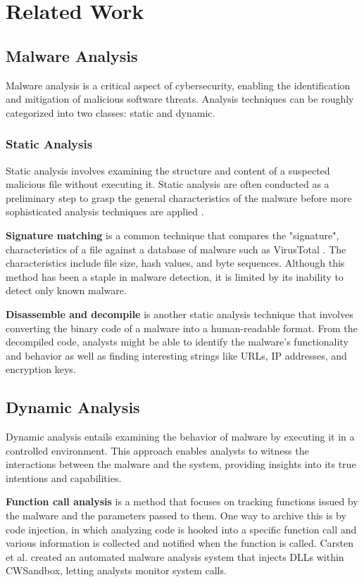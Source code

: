 \section{Related Work}
\subsection{Malware Analysis}
Malware analysis is a critical aspect of cybersecurity, enabling the identification
and mitigation of malicious software threats.
Analysis techniques can be roughly categorized into two classes: static and dynamic.

\subsubsection{Static Analysis}
Static analysis involves examining the structure and content of a suspected malicious file without executing it.
Static analysis are often conducted as a preliminary step to grasp the general characteristics of the malware
before more sophisticated analysis techniques are applied \cite{chakkaravarthy2019survey}.

\textbf{Signature matching} is a common technique that compares the "signature", characteristics of a file
against a database of malware such as VirusTotal \cite{VirusTot28:online}. The characteristics include file size, hash values, and byte sequences.
Although this method has been a staple in malware detection, it is limited by its inability to detect only known malware.

\textbf{Disassemble and decompile} is another static analysis technique
that involves converting the binary code of a malware into a human-readable format.
From the decompiled code, analysts might be able to identify the malware's functionality and behavior as well as finding
interesting strings like URLs, IP addresses, and encryption keys.

\subsection{Dynamic Analysis \cite{10.1145/3329786}}
Dynamic analysis entails examining the behavior of malware by executing it in a controlled environment.
This approach enables analysts to witness the interactions between the malware and the system,
providing insights into its true intentions and capabilities.

\textbf{Function call analysis} is a method that focuses on tracking functions issued by the malware and the parameters
passed to them. One way to archive this is by code injection, in which analyzing code is hooked into
a specific function call and various information is collected and notified when the function is called.
Carsten et al. \cite{willems2007toward} created an automated malware analysis system that injects DLLs within CWSandbox,
letting analysts monitor system calls.

